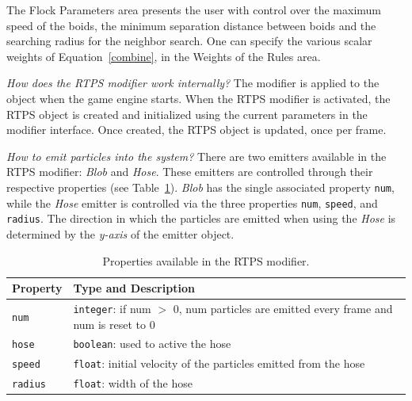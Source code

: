 The Flock Parameters area presents the user with control over the maximum speed of the boids, the minimum separation distance between boids and the searching radius for the neighbor search. One can specify the various scalar weights of Equation~\ref{combine}, in the Weights of the Rules area.

\textit{How does the RTPS modifier work internally?} The modifier is applied to the object when the game engine starts. When the RTPS modifier is activated, the RTPS object is created and initialized using the current parameters in the modifier interface. Once created, the RTPS object is updated, once per frame. 

\textit{How to emit particles into the system?} There are two emitters available in the RTPS modifier: \textit{Blob} and \textit{Hose}. These emitters are controlled through their respective properties (see Table~\ref{properties}). \textit{Blob} has the single associated property \texttt{num}, while the \textit{Hose} emitter is controlled via the three properties \texttt{num}, \texttt{speed}, and \texttt{radius}. The direction in which the particles are emitted when using the \textit{Hose} is determined by the \textit{y-axis} of the emitter object. 

\begin{table}[htdp]
\caption{Properties available in the RTPS modifier.}
\begin{center}
\begin{tabular}{|p{3cm}|p{9cm}|}
\hline 
\textbf{Property} & \textbf{Type and Description} \\\hline 
\texttt{num} 	& \texttt{integer}: if num $>$ 0, num particles are emitted every frame and num is reset to 0	\\\hline 
\texttt{hose}	& \texttt{boolean}: used to active the hose	\\\hline
\texttt{speed}	& \texttt{float}: initial velocity of the particles emitted from the hose	\\\hline
\texttt{radius}	& \texttt{float}: width of the hose	\\ %
\hline 
\end{tabular}
\end{center}
\label{properties}
\end{table}

